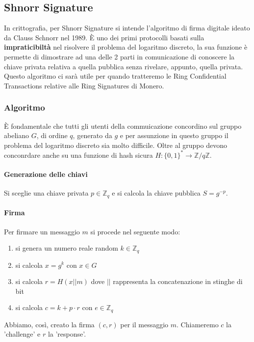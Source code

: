 \documentclass[12pt,a4paper]{article}
\begin{document}
\subsection{Shnorr Signature}
In crittografia, per Shnorr Signature si intende l'algoritmo di firma digitale
ideato da Clauss Schnorr nel 1989. È uno dei primi protocolli basati sulla
\textbf{impraticibiltà} nel risolvere il problema del logaritmo discreto, la sua
funzione è permette di dimostrare ad una delle 2 parti in comunicazione di
conoscere la chiave privata relativa a quella pubblica senza rivelare, appunto,
quella privata. Questo algoritmo ci sarà utile per quando tratteremo le Ring Confidential Transactions relative alle Ring Signatures di Monero.

\subsubsection*{Algoritmo}

È fondamentale che tutti gli utenti della commuicazione concordino sul gruppo
abeliano $ G $, di ordine $ q $, generato da $ g $ e per assunzione in questo
gruppo il problema del logaritmo discreto sia molto difficile. Oltre al gruppo
devono conconrdare anche su una funzione di hash sicura $ H:\{0,1\}^*
\rightarrow \mathbb{Z} / q\mathbb{Z} $.

\paragraph{Generazione delle chiavi}
Si sceglie una chiave privata $ p \in \mathbb{Z}_q $ e si calcola la chiave
pubblica $ S = g^{-p} $.

\paragraph{Firma}
Per firmare un messaggio $ m $ si procede nel seguente modo:
\begin{enumerate}
    \item si genera un numero reale random $ k \in \mathbb{Z}_q $
    \item si calcola $ x = g^k $ con $ x \in G $ 
    \item si calcola $ r = H(x || m) $ dove $ || $ rappresenta la concatenazione
    in stinghe di bit
    \item si calcola $ c = k + p \cdot r $ con $ e \in \mathbb{Z}_q $
\end{enumerate}

Abbiamo, così, creato la firma $ (c, r) $ per il messaggio $ m $. Chiameremo $ c
$ la 'challenge' e $ r $ la 'response'.
\end{document}
